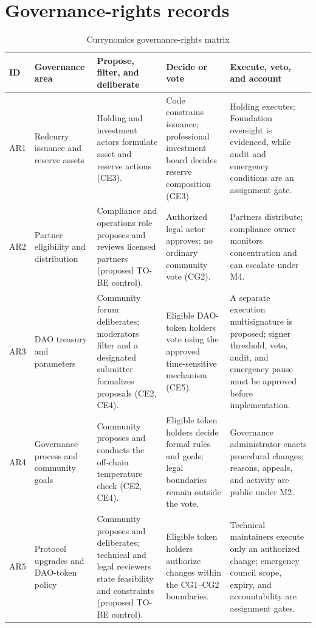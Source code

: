\documentclass[10pt]{article}
\begin{document}
\section*{Governance-rights records}
\begin{table}[h]
\caption{Currynomics governance-rights matrix}
\centering
\footnotesize
\begin{tabularx}{\linewidth}{@{}p{.05\linewidth}p{.13\linewidth}YYY@{}}
\toprule
ID & Governance area & Propose, filter, and deliberate & Decide or vote & Execute,
veto, and account \\
\midrule
AR1 & Redcurry issuance and reserve assets & Holding and investment actors
formulate asset and reserve actions (CE3). & Code constrains issuance;
professional investment board decides reserve composition (CE3). & Holding
executes; Foundation oversight is evidenced, while audit and emergency
conditions are an assignment gate. \\
AR2 & Partner eligibility and distribution & Compliance and operations role
proposes and reviews licensed partners (proposed TO-BE control). & Authorized
legal actor approves; no ordinary community vote (CG2). & Partners distribute;
compliance owner monitors concentration and can escalate under M4. \\
AR3 & DAO treasury and parameters & Community forum deliberates; moderators
filter and a designated submitter formalizes proposals (CE2, CE4). & Eligible
DAO-token holders vote using the approved time-sensitive mechanism (CE5). & A
separate execution multisignature is proposed; signer threshold, veto, audit,
and emergency pause must be approved before implementation. \\
AR4 & Governance process and community goals & Community proposes and conducts
the off-chain temperature check (CE2, CE4). & Eligible token holders decide
formal rules and goals; legal boundaries remain outside the vote. & Governance
administrator enacts procedural changes; reasons, appeals, and activity are
public under M2. \\
AR5 & Protocol upgrades and DAO-token policy & Community proposes and
deliberates; technical and legal reviewers state feasibility and constraints
(proposed TO-BE control). & Eligible token holders authorize changes within the
CG1--CG2 boundaries. & Technical maintainers execute only an authorized change;
emergency council scope, expiry, and accountability are assignment gates. \\
\bottomrule
\end{tabularx}
\end{table}
\end{document}
